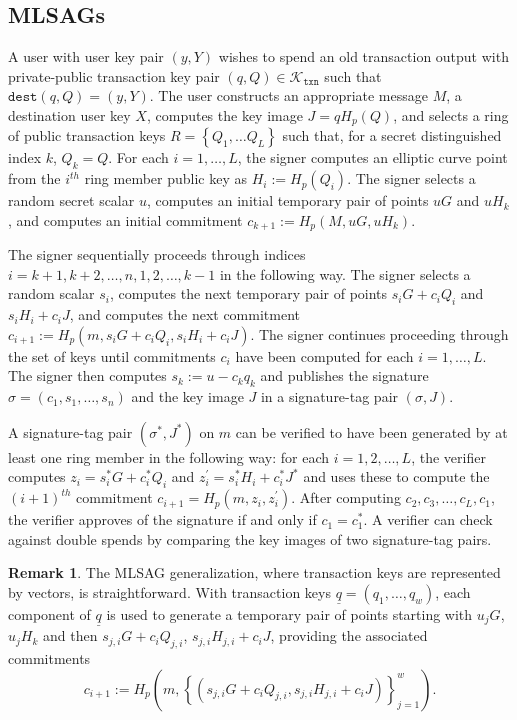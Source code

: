 \documentclass{mrl}
\theoremstyle{definition}
\newtheorem{disc}[theorem]{Remark}
\begin{document}
\subsection{MLSAGs}

A user with user key pair $(y,Y)$ wishes to spend an old transaction output with private-public transaction key pair $(q,Q) \in \mathcal{K}_{\texttt{txn}}$ such that $\texttt{dest}(q,Q) = (y,Y)$. The user constructs an appropriate message $M$, a destination user key $X$, computes the key image $J = qH_p(Q)$, and selects a ring of public transaction keys $R=\left\{Q_1, \ldots Q_L\right\}$ such that, for a secret distinguished index $k$, $Q_{k}=Q$. For each $i=1,\ldots,L$, the signer computes an elliptic curve point from the $i^{th}$ ring member public key  as $H_i := H_{p}(Q_i)$. The signer selects a random secret scalar $u$, computes an initial temporary pair of points $uG$ and $uH_{k}$, and computes an initial commitment $c_{k+1} := H_{p}(M,uG, uH_k)$. 

The signer sequentially proceeds through indices $i=k+1, k+2, \ldots, n, 1, 2, \ldots, k-1$ in the following way. The signer selects a random scalar $s_i$, computes the next temporary pair of points $s_iG + c_i Q_i$ and $s_i H_i + c_i J$, and computes the next commitment $c_{i+1}:=H_{p}(m,s_i G + c_i Q_i, s_i H_i + c_i J)$. The signer continues proceeding through the set of keys until commitments $c_i$ have been computed for each $i=1, \ldots, L$. The signer then computes $s_{k}:=u - c_{k}q_{k}$ and publishes the signature $\sigma=(c_1, s_1, \ldots, s_n)$ and the key image $J$ in a signature-tag pair $(\sigma, J)$.

A signature-tag pair $(\sigma^*, J^*)$ on $m$ can be verified to have been generated by at least one ring member in the following way: for each $i=1,2,\ldots, L$, the verifier computes $z_{i} = s_i^* G + c_i^* Q_i$ and $z_{i}^{\prime} = s_i^* H_i + c_i^* J^*$ and uses these to compute the $(i+1)^{th}$ commitment $c_{i+1} = H_{p}(m, z_i, z^{\prime}_i)$. After computing $c_2, c_3, \ldots, c_L, c_1$, the verifier approves of the signature if and only if $c_1 = c_1^*$. A verifier can check against double spends by comparing the key images of two signature-tag pairs.

\begin{disc}
The MLSAG generalization, where transaction keys are represented by vectors, is straightforward. With transaction keys $\underline{q}=(q_1,\ldots,q_w)$, each component of $\underline{q}$ is used to generate a temporary pair of points starting with $u_jG$, $u_j H_k$ and then $s_{j,i} G + c_{i} Q_{j,i}$, $s_{j,i} H_{j,i} + c_{i} J$, providing the associated commitments
\[c_{i+1}:=H_{p}\left(m,\left\{(s_{j,i} G + c_i Q_{j,i}, s_{j,i} H_{j,i} + c_i J)\right\}_{j=1}^{w}\right).\]
\end{disc}
\end{document}
